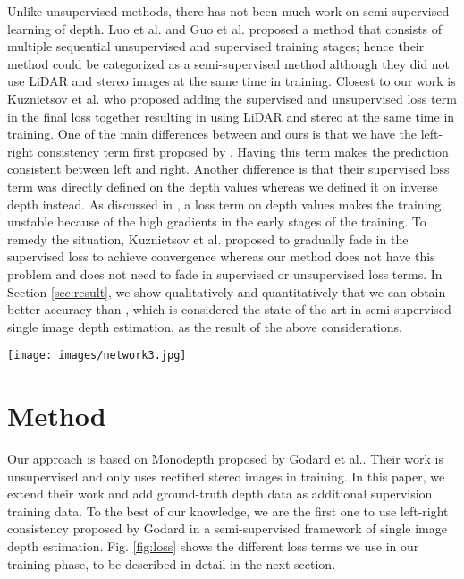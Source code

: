\documentclass[letterpaper, 10 pt, conference]{ieeeconf}
\begin{document}
Unlike unsupervised methods, there has not been much work on semi-supervised learning of depth. Luo et al. \cite{luo2018single} and Guo et al.\cite{Guo_2018_ECCV} proposed a method that consists of multiple sequential unsupervised and supervised training stages; hence their method could be categorized as a semi-supervised method although they did not use LiDAR and stereo images at the same time in training.
Closest to our work is Kuznietsov et al. \cite{kuznietsov2017semi} who proposed adding the supervised and unsupervised loss term in the final loss together resulting in using LiDAR and stereo at the same time in training. One of the main differences between\cite{kuznietsov2017semi} and ours is that we have the left-right consistency term first proposed by \cite{godard2017unsupervised}. Having this term makes the prediction consistent between left and right. Another difference is that their supervised loss term was directly defined on the depth values whereas we defined it on inverse depth instead. As discussed in \cite{kuznietsov2017semi}, a loss term on depth values makes the training unstable because of the high gradients in the early stages of the training. To remedy the situation, Kuznietsov et al. proposed to gradually fade in the supervised loss to achieve convergence whereas our method does not have this problem and does not need to fade in supervised or unsupervised loss terms. In Section \ref{sec:result}, we show qualitatively and quantitatively that we can obtain better accuracy than \cite{kuznietsov2017semi}, which is considered the state-of-the-art in semi-supervised single image depth estimation, as the result of the above considerations. 
 
 \begin{figure*} [!h]
        \centering
        \texttt{[image: images/network3.jpg]}
        \caption{Overview of the schematic of our proposed loss. There are 4 terms in our loss , , , , . Subscript  and  refers to left and right image, respectively.  refers to output of our network inverse depth. We use bilinear sampler in the inverse warping function.}
        \label{fig:loss}
    \end{figure*}
      
      

\section{Method}
 Our approach is based on Monodepth proposed by Godard et al.\cite{godard2017unsupervised}. Their work is unsupervised and only uses rectified stereo images in training. In this paper, we extend their work and add ground-truth depth data as additional supervision training data. To the best of our knowledge, we are the first one to use left-right consistency proposed by Godard \cite{godard2017unsupervised} in a semi-supervised framework of single image depth estimation. Fig. \ref{fig:loss} shows the different loss terms we use in our training phase, to be described in detail in the next section. 
\end{document}
